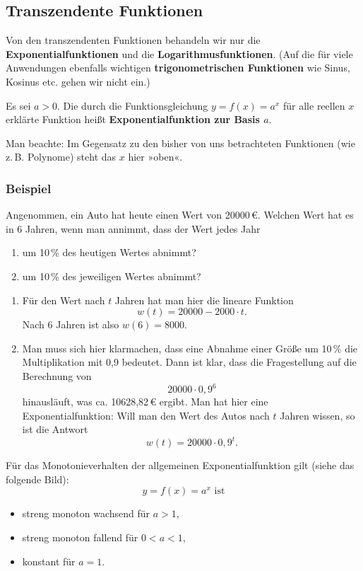 \subsection{Transzendente Funktionen}

Von den transzendenten Funktionen behandeln wir nur die \textbf{Exponentialfunktionen} und die \textbf{Logarithmusfunktionen}. (Auf die für viele Anwendungen ebenfalls wichtigen \textbf{trigonometrischen Funktionen} wie Sinus, Kosinus etc. gehen wir nicht ein.)

Es sei $a > 0$. Die durch die Funktionsgleichung $y = f(x) = a^x$ für alle reellen $x$ erklärte Funktion heißt \textbf{Exponentialfunktion zur Basis $a$}.

Man beachte: Im Gegensatz zu den bisher von uns betrachteten Funktionen (wie z.\,B. Polynome) steht das $x$ hier »oben«.

\subsubsection{Beispiel}

Angenommen, ein Auto hat heute einen Wert von 20000\,€. Welchen Wert hat es in 6 Jahren, wenn man annimmt, dass der Wert jedes Jahr
\begin{enumerate}[label=\alph*)]
  \item um 10\,\% des heutigen Wertes abnimmt?
  \item um 10\,\% des jeweiligen Wertes abnimmt?
\end{enumerate}

\begin{enumerate}[label=\alph*)]
  \item Für den Wert nach $t$ Jahren hat man hier die lineare Funktion
    \[ w(t) = 20000 - 2000 \cdot t . \]
    Nach 6 Jahren ist also $w(6) = 8000$.
  \item Man muss sich hier klarmachen, dass eine Abnahme einer Größe um 10\,\% die Multiplikation mit 0{,}9 bedeutet. Dann ist klar, dass die Fragestellung auf die Berechnung von
    \[ 20000 \cdot 0{,}9^6 \]
    hinausläuft, was ca. 10628{,}82\,€ ergibt.
    Man hat hier eine Exponentialfunktion: Will man den Wert des Autos nach $t$ Jahren wissen, so ist die Antwort
    \[ w(t) = 20000 \cdot 0{,}9^t . \]\beispielende
\end{enumerate}

Für das Monotonieverhalten der allgemeinen Exponentialfunktion gilt (siehe das folgende Bild):
\[ y = f(x) = a^x \text{ ist} \]
\begin{itemize}
  \item streng monoton wachsend für $a > 1$,
  \item streng monoton fallend für $0 < a < 1$,
  \item konstant für $a = 1$.
\end{itemize}

